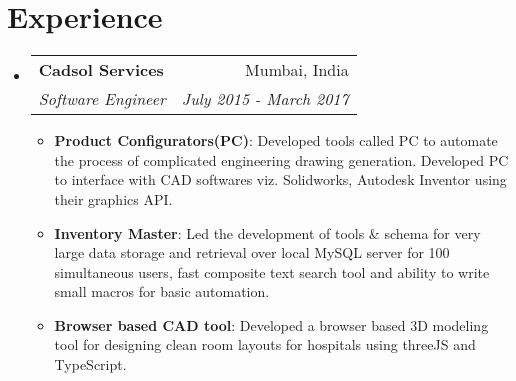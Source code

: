 \documentclass[letterpaper,11pt]{article}
\makeatletter
\newcommand{\resumeItem}[2]{
  \item\small{
    \textbf{#1}{: #2 \vspace{-2pt}}
  }
}
\newcommand{\resumeSubheading}[4]{
  \vspace{-1pt}\item
    \begin{tabular*}{0.97\textwidth}{l@{\extracolsep{\fill}}r}
      \textbf{#1} & #2 \\
      \textit{\small#3} & \textit{\small #4} \\
    \end{tabular*}\vspace{-5pt}
}
\newcommand{\resumeSubHeadingListStart}{\begin{itemize}[leftmargin=*]}
\newcommand{\resumeSubHeadingListEnd}{\end{itemize}}
\newcommand{\resumeItemListStart}{\begin{itemize}}
\newcommand{\resumeItemListEnd}{\end{itemize}\vspace{-5pt}}
\makeatother
\begin{document}
\section{Experience}
  \resumeSubHeadingListStart
    \resumeSubheading
      {Cadsol Services}{Mumbai, India}
      {Software Engineer}{July 2015 - March 2017}
      \resumeItemListStart
        \resumeItem{Product Configurators(PC)}
          {Developed tools called PC to automate the process of complicated engineering drawing generation. Developed PC to interface with CAD softwares viz. Solidworks, Autodesk Inventor using their graphics API.}
        \resumeItem{Inventory Master}{Led the development of tools \& schema for very large data storage and retrieval over local MySQL server for 100 simultaneous users, fast composite text search tool and ability to write small macros for basic automation.}
          \resumeItem{Browser based CAD tool}{Developed a browser based 3D modeling tool for designing clean room layouts for hospitals using threeJS and TypeScript.}
      \resumeItemListEnd
  \resumeSubHeadingListEnd
\end{document}
